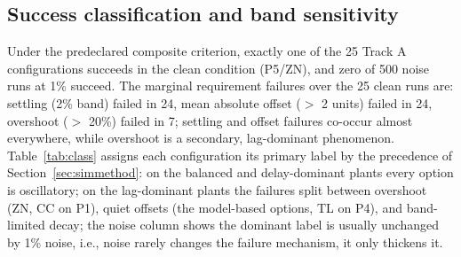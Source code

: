 \documentclass[10pt,twocolumn]{article}
\begin{document}
\subsection{Success classification and band sensitivity}
\label{sec:success}

Under the predeclared composite criterion, exactly one of the 25 Track A configurations succeeds in the clean condition (P5/ZN), and zero of 500 noise runs at 1\% succeed. The marginal requirement failures over the 25 clean runs are: settling (2\% band) failed in 24, mean absolute offset ($>$ 2 units) failed in 24, overshoot ($>$ 20\%) failed in 7; settling and offset failures co-occur almost everywhere, while overshoot is a secondary, lag-dominant phenomenon. Table~\ref{tab:class} assigns each configuration its primary label by the precedence of Section~\ref{sec:simmethod}: on the balanced and delay-dominant plants every option is oscillatory; on the lag-dominant plants the failures split between overshoot (ZN, CC on P1), quiet offsets (the model-based options, TL on P4), and band-limited decay; the noise column shows the dominant label is usually unchanged by 1\% noise, i.e., noise rarely changes the failure mechanism, it only thickens it.

\begin{table}[t]
\centering
\caption{Failure classification under the predeclared success criterion (clean run; one primary label by the precedence of Section~\ref{sec:simmethod}) and the dominant label across 20 seeds at 1\% noise. Labels: OK (success), overshoot ($>$ 20\%), offset (mean $|e| > 2$ units), oscillatory (outside the 5\% band), band (2\% band not held, no other violation).}
\label{tab:class}
\scriptsize
\setlength{\tabcolsep}{4pt}

\end{table}
\end{document}
